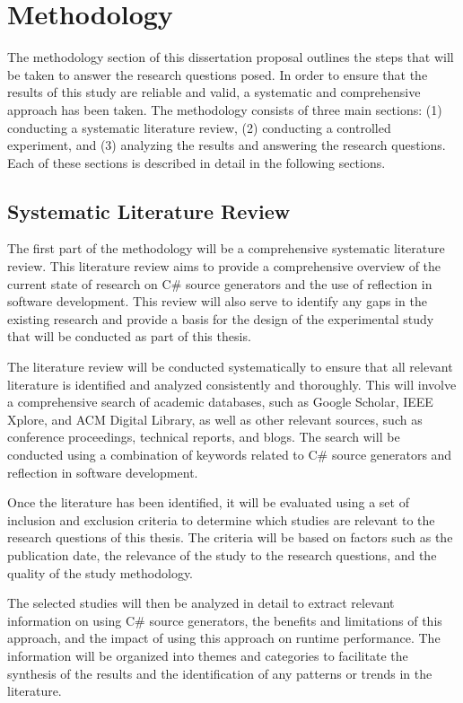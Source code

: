 \chapter{Methodology}

The methodology section of this dissertation proposal outlines the steps that will be taken to answer the research questions posed. In order to ensure that the results of this study are reliable and valid, a systematic and comprehensive approach has been taken. The methodology consists of three main sections: (1) conducting a systematic literature review, (2) conducting a controlled experiment, and (3) analyzing the results and answering the research questions. Each of these sections is described in detail in the following sections.


\section{Systematic Literature Review}

The first part of the methodology will be a comprehensive systematic literature review. This literature review aims to provide a comprehensive overview of the current state of research on C\# source generators and the use of reflection in software development. This review will also serve to identify any gaps in the existing research and provide a basis for the design of the experimental study that will be conducted as part of this thesis.

The literature review will be conducted systematically to ensure that all relevant literature is identified and analyzed consistently and thoroughly. This will involve a comprehensive search of academic databases, such as Google Scholar, IEEE Xplore, and ACM Digital Library, as well as other relevant sources, such as conference proceedings, technical reports, and blogs. The search will be conducted using a combination of keywords related to C\# source generators and reflection in software development.

Once the literature has been identified, it will be evaluated using a set of inclusion and exclusion criteria to determine which studies are relevant to the research questions of this thesis. The criteria will be based on factors such as the publication date, the relevance of the study to the research questions, and the quality of the study methodology.

The selected studies will then be analyzed in detail to extract relevant information on using C\# source generators, the benefits and limitations of this approach, and the impact of using this approach on runtime performance. The information will be organized into themes and categories to facilitate the synthesis of the results and the identification of any patterns or trends in the literature.

